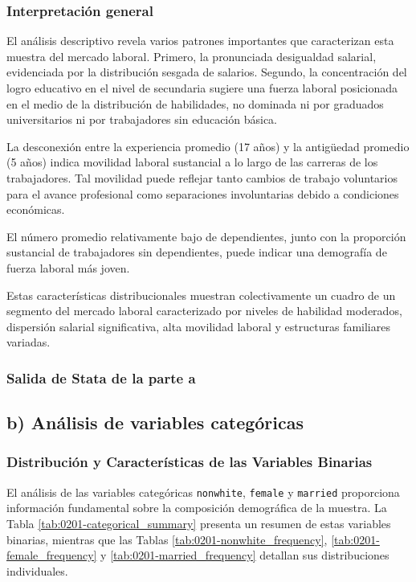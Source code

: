 \documentclass[12pt]{article}
\begin{document}
\subsubsection*{Interpretación general}

El análisis descriptivo revela varios patrones importantes que caracterizan esta muestra del mercado laboral. Primero, la pronunciada desigualdad salarial, evidenciada por la distribución sesgada de salarios. Segundo, la concentración del logro educativo en el nivel de secundaria sugiere una fuerza laboral posicionada en el medio de la distribución de habilidades, no dominada ni por graduados universitarios ni por trabajadores sin educación básica.

La desconexión entre la experiencia promedio (17 años) y la antigüedad promedio (5 años) indica movilidad laboral sustancial a lo largo de las carreras de los trabajadores. Tal movilidad puede reflejar tanto cambios de trabajo voluntarios para el avance profesional como separaciones involuntarias debido a condiciones económicas.

El número promedio relativamente bajo de dependientes, junto con la proporción sustancial de trabajadores sin dependientes, puede indicar una demografía de fuerza laboral más joven.

Estas características distribucionales muestran colectivamente un cuadro de un segmento del mercado laboral caracterizado por niveles de habilidad moderados, dispersión salarial significativa, alta movilidad laboral y estructuras familiares variadas.

\subsubsection*{Salida de Stata de la parte a}



\subsection*{b) Análisis de variables categóricas}

\subsubsection*{Distribución y Características de las Variables Binarias}

El análisis de las variables categóricas \texttt{nonwhite}, \texttt{female} y \texttt{married} proporciona información fundamental sobre la composición demográfica de la muestra. La Tabla \ref{tab:0201-categorical_summary} presenta un resumen de estas variables binarias, mientras que las Tablas \ref{tab:0201-nonwhite_frequency}, \ref{tab:0201-female_frequency} y \ref{tab:0201-married_frequency} detallan sus distribuciones individuales.
\end{document}
